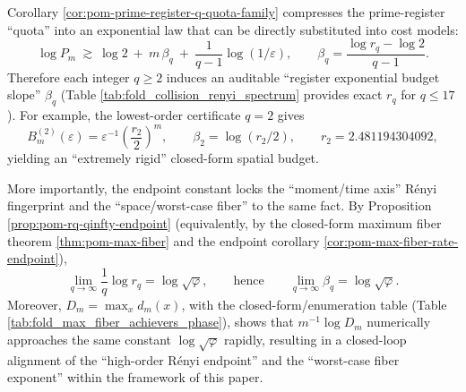 \begin{remark}\label{rem:pom-betaq-isa}
Corollary \ref{cor:pom-prime-register-q-quota-family} compresses the prime-register ``quota'' into an exponential law that can be directly substituted into cost models:
\[
\log P_m\ \gtrsim\ \log 2\ +\ m\,\beta_q\ +\ \frac{1}{q-1}\log(1/\varepsilon),
\qquad
\beta_q=\frac{\log r_q-\log 2}{q-1}.
\]
Therefore each integer \(q\ge 2\) induces an auditable ``register exponential budget slope'' \(\beta_q\) (Table \ref{tab:fold_collision_renyi_spectrum} provides exact \(r_q\) for \(q\le 17\)).
For example, the lowest-order certificate \(q=2\) gives
\[
B_m^{(2)}(\varepsilon)=\varepsilon^{-1}\left(\frac{r_2}{2}\right)^m,
\qquad
\beta_2=\log(r_2/2),
\qquad
r_2=2.481194304092,
\]
yielding an ``extremely rigid'' closed-form spatial budget.
\par
More importantly, the endpoint constant locks the ``moment/time axis'' R\'{e}nyi fingerprint and the ``space/worst-case fiber'' to the same fact.
By Proposition \ref{prop:pom-rq-qinfty-endpoint} (equivalently, by the closed-form maximum fiber theorem \ref{thm:pom-max-fiber} and the endpoint corollary \ref{cor:pom-max-fiber-rate-endpoint}),
\[
\lim_{q\to\infty}\frac{1}{q}\log r_q=\log\sqrt{\varphi},
\qquad\text{hence}\qquad
\lim_{q\to\infty}\beta_q=\log\sqrt{\varphi}.
\]
Moreover, \(D_m=\max_x d_m(x)\), with the closed-form/enumeration table (Table \ref{tab:fold_max_fiber_achievers_phase}), shows that
\(
m^{-1}\log D_m
\)
numerically approaches the same constant \(\log\sqrt{\varphi}\) rapidly, resulting in a closed-loop alignment of the ``high-order R\'{e}nyi endpoint'' and the ``worst-case fiber exponent'' within the framework of this paper.
\end{remark}


